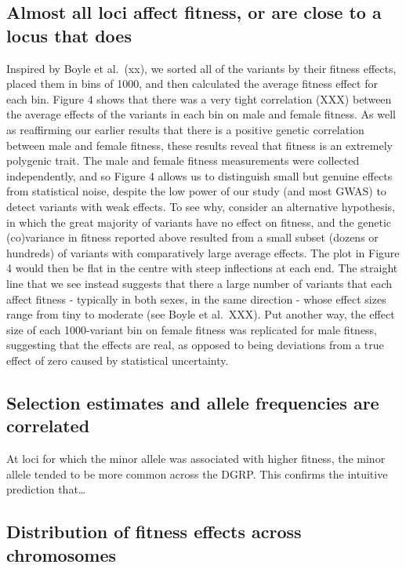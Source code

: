 \documentclass{article}
\begin{document}
\subsection*{Almost all loci affect fitness, or are close to a locus that does}

Inspired by Boyle et al.~(xx), we sorted all of the variants by their
fitness effects, placed them in bins of 1000, and then calculated the
average fitness effect for each bin. Figure 4 shows that there was a
very tight correlation (XXX) between the average effects of the variants
in each bin on male and female fitness. As well as reaffirming our
earlier results that there is a positive genetic correlation between
male and female fitness, these results reveal that fitness is an
extremely polygenic trait. The male and female fitness measurements were
collected independently, and so Figure 4 allows us to distinguish small
but genuine effects from statistical noise, despite the low power of our
study (and most GWAS) to detect variants with weak effects. To see why,
consider an alternative hypothesis, in which the great majority of
variants have no effect on fitness, and the genetic (co)variance in
fitness reported above resulted from a small subset (dozens or hundreds)
of variants with comparatively large average effects. The plot in Figure
4 would then be flat in the centre with steep inflections at each end.
The straight line that we see instead suggests that there a large number
of variants that each affect fitness - typically in both sexes, in the
same direction - whose effect sizes range from tiny to moderate (see
Boyle et al.~XXX). Put another way, the effect size of each 1000-variant
bin on female fitness was replicated for male fitness, suggesting that
the effects are real, as opposed to being deviations from a true effect
of zero caused by statistical uncertainty.

\subsection*{Selection estimates and allele frequencies are correlated}

At loci for which the minor allele was associated with higher fitness,
the minor allele tended to be more common across the DGRP. This confirms
the intuitive prediction that\ldots{}

\subsection*{Distribution of fitness effects across chromosomes}
\end{document}
